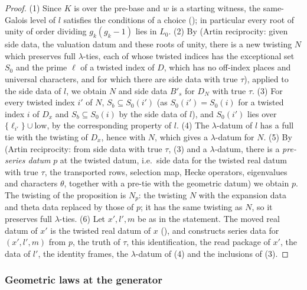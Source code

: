 \begin{proof}
(1) Since $K$ is over the pre-base and $w$ is a starting witness, the same-Galois level of $l$ satisfies the
conditions of a choice (); in particular every root of
unity of order dividing $g_k(g_k-1)$ lies in $L_0$.
(2) By  (Artin reciprocity: given side data, the
valuation datum and these roots of unity, there is a new twisting $N$ which preserves full $\lambda$-ties, each of
whose twisted indices has the exceptional set $S_0$ and the prime $\ell$ of a twisted index of $D$, which has no
off-index places and universal characters, and for which there are side data with true $\tau$), applied to the
side data of $l$, we obtain $N$ and side data $B'_s$ for $D_N$ with true $\tau$.
(3) For every twisted index $i'$ of $N$, $S_b\subseteq S_0(i')$ (as $S_0(i')=S_0(i)$ for a twisted index $i$ of $D_x$
and $S_b\subseteq S_0(i)$ by the side data of $l$), and $S_0(i')$ lies over $\{\ell_{i'}\}\cup\mathrm{low}$, by the
corresponding property of $l$.
(4) The $\lambda$-datum of $l$ has a full tie with the twisting of $D_x$, hence with $N$, which gives a
$\lambda$-datum for $N$.
(5) By  (Artin
reciprocity: from side data with true $\tau$, (3) and a $\lambda$-datum, there is a \emph{pre-series datum} $p$ at
the twisted datum, i.e.\ side data for the twisted real datum with true $\tau$, the transported rows, selection
map, Hecke operators, eigenvalues and characters $\theta$, together with a pre-tie with the geometric datum) we
obtain $p$. The twisting of the proposition is $N_p$: the twisting $N$ with the expansion data and theta data
replaced by those of $p$; it has the same twisting as $N$, so it preserves full $\lambda$-ties.
(6) Let $x',l',m$ be as in the statement. The moved real datum of $x'$ is the twisted real datum of $x$
(), and
 constructs series data for
$(x',l',m)$ from $p$, the truth of $\tau$, this identification, the read package of $x'$, the data of $l'$, the
identity frames, the $\lambda$-datum of (4) and the inclusions of (3).
\end{proof}

\subsubsection{Geometric laws at the generator}

